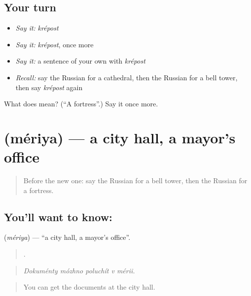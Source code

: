 \subsection*{Your turn}
\begin{itemize}
\raggedright
  \item \emph{Say it:} \emph{krépost}
  \item \emph{Say it:} \emph{krépost}, once more
  \item \emph{Say it:} a sentence of your own with \emph{krépost}
  \item \emph{Recall:} say the Russian for a cathedral, then the Russian for a bell tower, then say \emph{krépost} again
\end{itemize}

\begin{tcolorbox}[breakable,colback=teal!4,colframe=teal!35!black,title={Before you move on}]
What does  mean? (\textquotedblleft{}A fortress\textquotedblright{}.) Say it once more.
\end{tcolorbox}
\section[\texorpdfstring{\ru{мэрия} (mériya)}{мэрия (mériya)}]{ (mériya) — a city hall, a mayor's office}

\label{lesson:RU-C444-meriya}



\begin{quote}
Before the new one: say the Russian for a bell tower, then the Russian for a fortress.
\end{quote}

\subsection*{You'll want to know: }
\textbf{} (\emph{mériya}) — \textquotedblleft{}a city hall, a mayor's office\textquotedblright{}.

\begin{quote}
    .
\end{quote}

\begin{quote}
\emph{Dokuménty mózhno poluchít v mérii.}
\end{quote}

\begin{quote}
You can get the documents at the city hall.
\end{quote}


